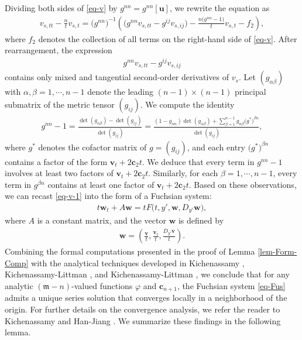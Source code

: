 \documentclass[11pt,reqno]{amsart}
\newcommand{\fm}{\mathfrak{m}}
\theoremstyle{definition}
\numberwithin{equation}{section}
\begin{document}
Dividing both sides of \eqref{eq-v} by $g^{nn}=g^{nn}[\mathbf{u}]$, we rewrite the equation as
\begin{align}\label{eq-v-1}
    v_{s, tt} - \frac{n}{t}v_{s, t} = \bigl(g^{nn}\bigr)^{-1}\left(\bigl(g^{nn}v_{s,tt} - g^{ij}v_{s, ij}\bigr) - \frac{n\bigl(g^{nn}-1\bigr)}{t} v_{s,t}-  f_2\right),
\end{align}
where $f_2$ denotes the collection of all terms on the right-hand side of \eqref{eq-v}. After rearrangement, the expression
\begin{align}
g^{nn}v_{s,tt} - g^{ij}v_{s, ij}
\end{align}
contains only mixed and tangential second-order derivatives of $v_s$. Let $(g_{\alpha\beta})$ with $\alpha,\beta = 1,\cdots, n-1$ denote the leading $(n-1)\times (n-1)$ principal submatrix of the metric tensor $(g_{ij})$. We compute the identity
\begin{align}
    g^{nn}-1 = \frac{\det(g_{\alpha\beta} ) - \det (g_{ij})}{\det (g_{ij})} =\frac{(1-g_{nn})\det(g_{\alpha\beta})+\sum_{\beta=1}^{n-1}g_{n \beta} \bigl(g^*\bigr)^{\beta n} }{\det (g_{ij})},
\end{align}
where $g^*$ denotes the cofactor matrix of $g=(g_{ij})$, and each entry $\bigl(g^*\bigr)^{\beta n}$ contains a factor of the form $\mathbf{v}_t + 2\mathbf{c}_2 t$. We deduce that every term in $g^{nn}-1$ involves at least two factors of $\mathbf{v}_t + 2\mathbf{c}_2 t$. Similarly, for each $\beta=1, \cdots, n-1$, every term in $g^{\beta n}$ contains at least one factor of $\mathbf{v}_t + 2\mathbf{c}_2 t$. Based on these observations, we can recast \eqref{eq-v-1} into the form of a Fuchsian system:
\begin{align}\label{eq-Fus}
    t \mathbf{w}_t + A\mathbf{w} = t F\bigl(t, y', \mathbf{w}, D_{y'}\mathbf{w}\bigr),
\end{align}
where $A$ is a constant matrix, and the vector $\mathbf{w}$ is defined by
\begin{align}
    \mathbf{w} = \left(\frac{\mathbf{v}}{t}, \frac{\mathbf{v}_t}{t},\frac{ D_{y'}\mathbf{v}}{t}\right).
\end{align}
Combining the formal computations presented in the proof of Lemma \ref{lem-Form-Comp} with the analytical techniques developed in Kichenassamy \cite{K2}, Kichenassamy-Littman \cite{KL1}, and Kichenassamy-Littman \cite{KL2}, we conclude that for any analytic $(\fm-n)$-valued functions $\varphi$ and $\mathbf{c}_{n+1}$, the Fuchsian system \eqref{eq-Fus} admits a unique series solution that converges locally in a neighborhood of the origin. For further details on the convergence analysis, we refer the reader to Kichenassamy \cite{K1} and Han-Jiang \cite{HanJiang1}. We summarize these findings in the following lemma.
\end{document}
